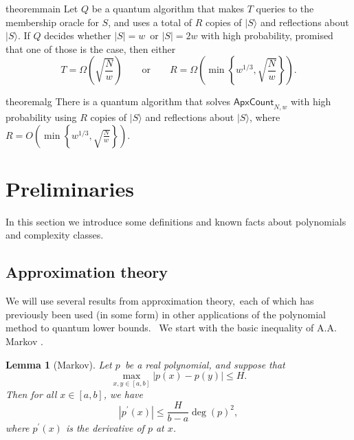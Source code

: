 \documentclass[10pt,a4paper]{article}
\newtheorem{lemma}[theorem]{Lemma}
\newcommand{\<}{\langle}
\renewcommand{\>}{\rangle}
\newcommand{\ApxCount}{\mathsf{ApxCount}_{N,w}}
\begin{document}
\setcounter{theorem}{3}
\begin{restatable}{theorem}{main}
\label{thm:main}
Let $Q$ be a quantum algorithm that makes $T$ queries to the membership oracle for $S$,
and uses a total of $R$ copies of $|S\>$ and reflections about $|S\>$.
If $Q$ decides whether $\left\vert S\right\vert =w$\ or $\left\vert S\right\vert =2w$
with high probability, promised that one of those is the case, then either
\begin{equation}
T=\Omega\left(  \sqrt{\frac{N}{w}}\right)  \qquad \textrm{or} \qquad
R=\Omega\left(  \min\left\{  w^{1/3},\sqrt{\frac{N}{w}}\right\}  \right).
\end{equation}
\end{restatable}

\begin{restatable}{theorem}{alg}
\label{thm:alg}
There is a quantum algorithm that solves $\ApxCount$ with high probability using
$R$ copies of $|S\>$ and reflections about $|S\>$, where $R = O\left( \min \left\{ w^{1/3} , \sqrt{\frac{N}{w}} \right\} \right)$.
\end{restatable}

\setcounter{section}{1}
\setcounter{theorem}{5}
\setcounter{equation}{4}
\section{Preliminaries}

\label{sec:prelim}

In this section we introduce some definitions and known facts about
polynomials and complexity classes.

%
\subsection{Approximation theory}
\label{s:approxprelim}
We will use several results from approximation theory,\ each of which has
previously been used (in some form) in other applications of the polynomial
method to quantum lower bounds. \ We start with the basic inequality of A.A.
Markov \cite{markov1890question}.

\begin{lemma}[Markov]
\label{markovlem}Let $p$\ be a real polynomial, and suppose that
\begin{equation}
\max_{x,y\in\left[ a,b\right] }\left\vert p\left( x\right) -p\left( y\right)
\right\vert \leq H.
\end{equation}
Then for all $x\in\left[ a,b\right] $, we have
\begin{equation}
\left\vert p^{\prime}\left( x\right) \right\vert \leq\frac{H}{b-a}\deg\left(
p\right) ^{2},
\end{equation}
where $p^{\prime}(x)$ is the derivative of $p$ at $x$.
\end{lemma}
\end{document}
